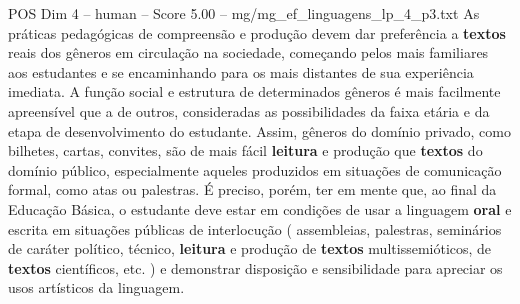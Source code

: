 \begin{textsample}{POS Dim 4 – human – Score 5.00 – mg/mg\_ef\_linguagens\_lp\_4\_p3.txt}  \label{ex:f4_pos_010}
As práticas pedagógicas de compreensão e produção devem dar preferência a \textbf{textos} reais dos gêneros em circulação na sociedade, começando pelos mais familiares aos estudantes e se encaminhando para os mais distantes de sua experiência imediata.
A função social e estrutura de determinados gêneros é mais facilmente apreensível que a de outros, consideradas as possibilidades da faixa etária e da etapa de desenvolvimento do estudante.
Assim, gêneros do domínio privado, como bilhetes, cartas, convites, são de mais fácil \textbf{leitura} e produção que \textbf{textos} do domínio público, especialmente aqueles produzidos em situações de comunicação formal, como atas ou palestras. É preciso, porém, ter em mente que, ao final da Educação Básica, o estudante deve estar em condições de usar a linguagem \textbf{oral} e escrita em situações públicas de interlocução ( assembleias, palestras, seminários de caráter político, técnico, \textbf{leitura} e produção de \textbf{textos} multissemióticos, de \textbf{textos} científicos, etc. ) e demonstrar disposição e sensibilidade para apreciar os usos artísticos da linguagem.

\end{textsample}
